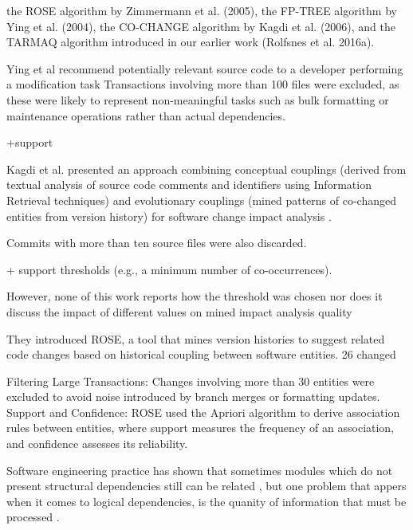
 the ROSE algorithm by Zimmermann et al. (2005), the
FP-TREE algorithm by Ying et al. (2004), the CO-CHANGE algorithm by Kagdi et al. (2006),
and the TARMAQ algorithm introduced in our earlier work (Rolfsnes et al. 2016a).


Ying et al \cite{Ying-co-change}
recommend potentially relevant source code to a developer performing a modification task
 Transactions involving more than 100 files were excluded, as these were likely to represent non-meaningful tasks such as bulk formatting or maintenance operations rather than actual dependencies.

 +support 



Kagdi et al. presented an approach combining conceptual couplings (derived from textual analysis of source code comments and identifiers using Information Retrieval techniques) and evolutionary couplings (mined patterns of co-changed entities from version history) for software change impact analysis \cite{article-Kagdi-commit}. 

 Commits with more than ten source files were also discarded.

 + support thresholds (e.g., a minimum number of co-occurrences).


 However, none of this work reports how the threshold was chosen nor does it discuss the impact of different values on mined impact analysis
quality





\cite{Zimmermann:2004:MVH:998675.999460}

They introduced ROSE, a tool that mines version histories to suggest related code changes based on historical coupling between software entities.
 26%
changed

Filtering Large Transactions: Changes involving more than 30 entities were excluded to avoid noise introduced by branch merges or formatting updates.
Support and Confidence: ROSE used the Apriori algorithm to derive association rules between entities, where support measures the frequency of an association, and confidence assesses its reliability.




Software engineering practice has shown that sometimes modules which do not present structural dependencies still can be related \cite{articleEvolution}, but one problem that appers when it comes to logical dependencies, is the quanity of information that must be processed \cite{Coupling-Lanza}.

